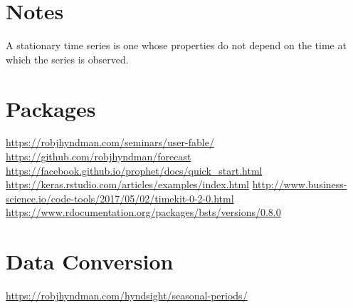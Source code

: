 \documentclass[]{book}
\newenvironment{Shaded}{\begin{snugshade}}{\end{snugshade}}
\newcommand{\KeywordTok}[1]{\textcolor[rgb]{0.13,0.29,0.53}{\textbf{#1}}}
\newcommand{\DataTypeTok}[1]{\textcolor[rgb]{0.13,0.29,0.53}{#1}}
\newcommand{\DecValTok}[1]{\textcolor[rgb]{0.00,0.00,0.81}{#1}}
\newcommand{\FloatTok}[1]{\textcolor[rgb]{0.00,0.00,0.81}{#1}}
\newcommand{\StringTok}[1]{\textcolor[rgb]{0.31,0.60,0.02}{#1}}
\newcommand{\OperatorTok}[1]{\textcolor[rgb]{0.81,0.36,0.00}{\textbf{#1}}}
\newcommand{\NormalTok}[1]{#1}
\theoremstyle{definition}
\theoremstyle{definition}
\theoremstyle{definition}
\theoremstyle{remark}
\begin{document}
\section{Notes}\label{notes}

A stationary time series is one whose properties do not depend on the
time at which the series is observed.

\section{Packages}\label{packages}

\url{https://robjhyndman.com/seminars/user-fable/}
\url{https://github.com/robjhyndman/forecast}
\url{https://facebook.github.io/prophet/docs/quick_start.html}
\url{https://keras.rstudio.com/articles/examples/index.html}
\url{http://www.business-science.io/code-tools/2017/05/02/timekit-0-2-0.html}
\url{https://www.rdocumentation.org/packages/bsts/versions/0.8.0}

\section{Data Conversion}\label{data-conversion}

\url{https://robjhyndman.com/hyndsight/seasonal-periods/}

\begin{Shaded}
\end{Shaded}
\end{document}
